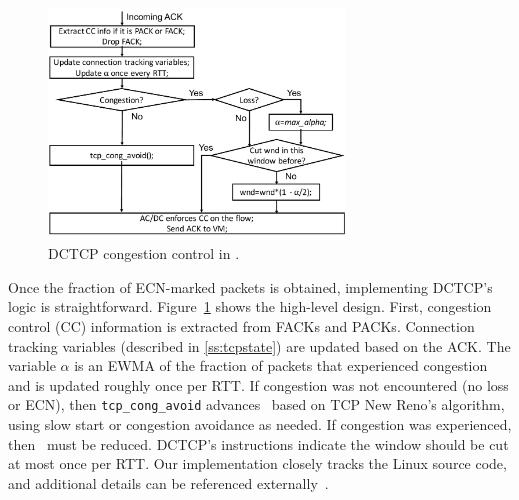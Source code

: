 \begin{figure}[!t]
        \centering
  \includegraphics[width=0.7\textwidth]{acdctcp/figures/acdc_cc.pdf}
        \caption{DCTCP congestion control in \acdc{}.}
        \label{acdc_cc}
\end{figure}
Once the fraction of ECN-marked packets is obtained, implementing DCTCP's logic is straightforward.
Figure~\ref{acdc_cc} shows the high-level design. 
First, congestion control (CC) information is extracted from FACKs and PACKs. Connection tracking
variables (described in \cref{ss:tcpstate}) are updated based on the ACK. The variable
$\alpha$ is an EWMA of the fraction of packets that experienced congestion and is updated roughly
once per RTT. If congestion was not encountered (no loss or ECN), then {\tt tcp\_cong\_avoid} advances~\cwnd{}
based on TCP New Reno's algorithm, using slow start or congestion avoidance as needed. If congestion was
experienced, then~\cwnd{} must be reduced. DCTCP's instructions indicate the window should
be cut at most once per RTT.
Our implementation closely tracks the Linux source code, and
additional details can be referenced externally~\cite{alizadeh2011data,ietf-tcpm-dctcp}.


